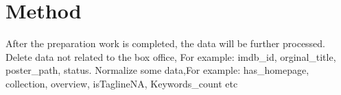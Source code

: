 



\section{Method} \label{sec-method}
After the preparation work is completed, the data will be further processed. 
Delete data not related to the box office, For example: imdb_id, orginal_title, poster_path, status.
Normalize some data,For example: has_homepage, collection, overview, isTaglineNA, Keywords_count etc

